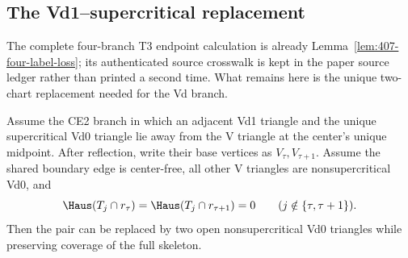 \subsection{The Vd1--supercritical replacement}
\label{sec:strategy2-rigor-completion}

The complete four-branch T3 endpoint calculation is already
Lemma~\ref{lem:407-four-label-loss}; its authenticated source crosswalk is
kept in the paper source ledger rather than printed a second time.  What
remains here is the unique two-chart replacement needed for the Vd branch.

\begin{proposition}
\label{prop:paper-vd1-pair-replacement}
Assume the CE2 branch in which an adjacent Vd1 triangle and the unique
supercritical Vd0 triangle lie away from the V triangle at the center's unique
midpoint.  After reflection, write their base vertices as $V_\tau,V_{\tau+1}$.
Assume the shared boundary edge is center-free, all other V triangles are
nonsupercritical Vd0, and
\[
 \Haus(T_j\cap r_\tau)=\Haus(T_j\cap r_{\tau+1})=0
 \qquad(j\notin\{\tau,\tau+1\}).
\]
Then the pair can be replaced by two open
nonsupercritical Vd0 triangles while preserving coverage of the full skeleton.
\end{proposition}

